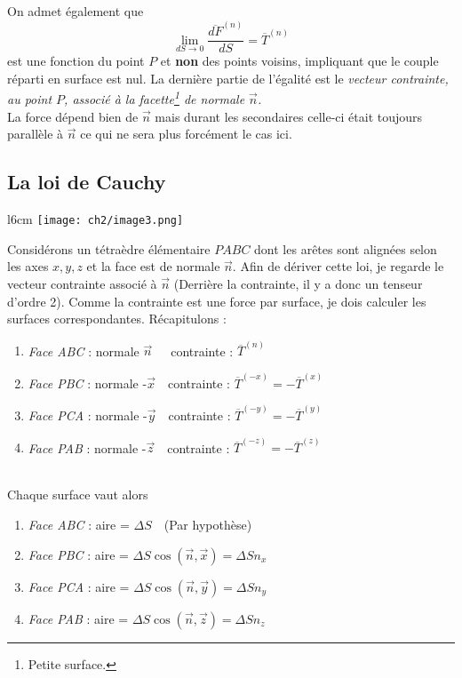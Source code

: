 On admet également que 
\begin{equation}
	\lim\limits_{dS \rightarrow 0} \frac{\overline{dF}^{(n)}}{dS} = \overline{T}^{(n)}
\end{equation}
est une fonction du point $P$ et \textbf{non} des points voisins, impliquant que le couple réparti
en surface est nul. La dernière partie de l'égalité est le \textit{vecteur contrainte, au point 
	$P$, associé à la facette\footnote{Petite surface.} de normale $\vec{n}$.}\\
La force dépend bien de $\vec{n}$ mais durant les secondaires celle-ci était toujours parallèle à
$\vec{n}$ ce qui ne sera plus forcément le cas ici.

\subsection{La loi de Cauchy}
\begin{wrapfigure}[12]{l}{6cm}
	\texttt{[image: ch2/image3.png]}
\end{wrapfigure}
Considérons un tétraèdre élémentaire $PABC$ dont les arêtes sont alignées selon les axes $x,y,z$
et la face est de normale $\vec{n} $. Afin de dériver cette loi, je regarde le vecteur contrainte
associé à $\vec n$ (Derrière la contrainte, il y a donc un tenseur d'ordre 2). Comme la contrainte
est une force par surface, je dois calculer les surfaces correspondantes. Récapitulons :
\begin{enumerate}
	\item \textit{Face ABC} : normale $\vec{n} $\ \ \ contrainte : $\overline{T}^{(n)}$
	\item \textit{Face PBC} : normale -$\vec{x} $\ \  contrainte : $\overline{T}^{(-x)} = -\overline{T}^{(x)}$
	\item \textit{Face PCA} : normale -$\vec{y} $\ \  contrainte : $\overline{T}^{(-y)} = -\overline{T}^{(y)}$
	\item \textit{Face PAB} : normale -$\vec{z} $\ \  contrainte : $\overline{T}^{(-z)} = -\overline{T}^{(z)}$
\end{enumerate}\ \\ 
Chaque surface vaut alors
\begin{enumerate}
	\item \textit{Face ABC} : aire =  $\Delta S$\ \ (Par hypothèse)
	\item \textit{Face PBC} : aire =  $\Delta S\cos(\vec{n},\vec{x}) = \Delta S n_x$
	\item \textit{Face PCA} : aire =  $\Delta S\cos(\vec{n},\vec{y}) = \Delta S n_y$
	\item \textit{Face PAB} : aire =  $\Delta S\cos(\vec{n},\vec{z}) = \Delta S n_z$
\end{enumerate}
    
